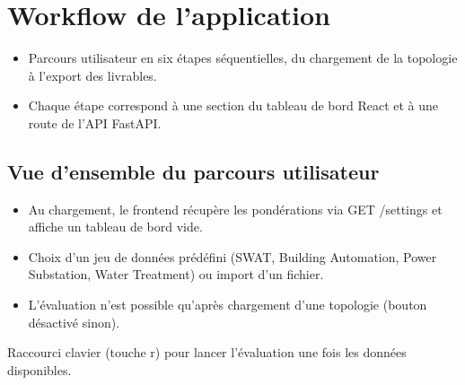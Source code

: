 \documentclass[12pt,a4paper]{article}
\newcommand{\forcereset}[1]{%
    \needspace{#1\baselineskip}%
}
\begin{document}
\newpage

\section{Workflow de l'application}
\forcereset{5}

\begin{itemize}[leftmargin=1.2cm, itemsep=0.2\baselineskip]
    \item Parcours utilisateur en six étapes séquentielles, du chargement de la topologie à l'export des livrables.
    \item Chaque étape correspond à une section du tableau de bord React et à une route de l'API FastAPI.
\end{itemize}

\subsection{Vue d'ensemble du parcours utilisateur}
\forcereset{4}
\begin{itemize}[leftmargin=1.2cm, itemsep=0.2\baselineskip]
    \item Au chargement, le frontend récupère les pondérations via GET /settings et affiche un tableau de bord vide.
    \item Choix d'un jeu de données prédéfini (SWAT, Building Automation, Power Substation, Water Treatment) ou import d'un fichier.
    \item L'évaluation n'est possible qu'après chargement d'une topologie (bouton désactivé sinon).
\end{itemize}

\begin{notebox}[Astuce]
Raccourci clavier (touche r) pour lancer l'évaluation une fois les données disponibles.
\end{notebox}
\end{document}

